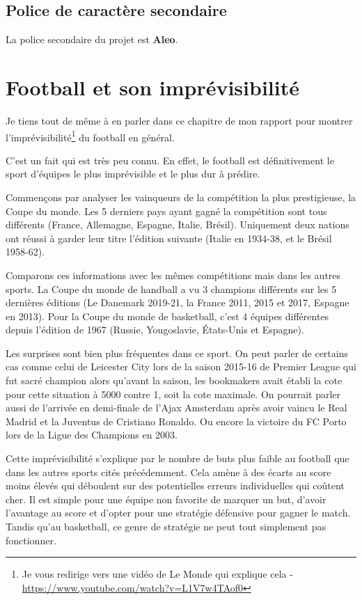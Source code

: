 \documentclass[a4paper,14pt]{extarticle}
\begin{document}
{\subsection{Police de caractère secondaire}
La police secondaire du projet est \textbf{Aleo}.

\newpage

\section{Football et son imprévisibilité}

Je tiens tout de même à en parler dans ce chapitre de mon rapport pour montrer l'imprévisibilité\footnote{Je vous redirige vers une vidéo de Le Monde qui explique cela - \url{https://www.youtube.com/watch?v=L1V7w4TAof0}} du football en général. 

C'est un fait qui est très peu connu. En effet, le football est définitivement le sport d'équipes le plus imprévisible et le plus dur à prédire. 

Commençons par analyser les vainqueurs de la compétition la plus prestigieuse, la Coupe du monde. Les 5 derniers pays ayant gagné la compétition sont tous différents (France, Allemagne, Espagne, Italie, Brésil). Uniquement deux nations ont réussi à garder leur titre l'édition suivante (Italie en 1934-38, et le Brésil 1958-62). 

Comparons ces informations avec les mêmes compétitions mais dans les autres sports. La Coupe du monde de handball a vu 3 champions différents sur les 5 dernières éditions (Le Danemark 2019-21, la France 2011, 2015 et 2017, Espagne en 2013). Pour la Coupe du monde de basketball, c'est 4 équipes différentes depuis l'édition de 1967 (Russie, Yougoslavie, États-Unis et Espagne). 

Les surprises sont bien plus fréquentes dans ce sport. On peut parler de certains cas comme celui de Leicester City lors de la saison 2015-16 de Premier League qui fut sacré champion alors qu'avant la saison, les bookmakers avait établi la cote pour cette situation à 5000 contre 1, soit la cote maximale. On pourrait parler aussi de l'arrivée en demi-finale de l'Ajax Amsterdam après avoir vaincu le Real Madrid et la Juventus de Cristiano Ronaldo. Ou encore la victoire du FC Porto lors de la Ligue des Champions en 2003.

Cette imprévisibilité s'explique par le nombre de buts plus faible au football que dans les autres sports cités précédemment. Cela amène à des écarts au score moins élevés qui déboulent sur des potentielles erreurs individuelles qui coûtent cher. Il est simple pour une équipe non favorite de marquer un but, d'avoir l'avantage au score et d'opter pour une stratégie défensive pour gagner le match. Tandis qu'au basketball, ce genre de stratégie ne peut tout simplement pas fonctionner.

}
\end{document}
